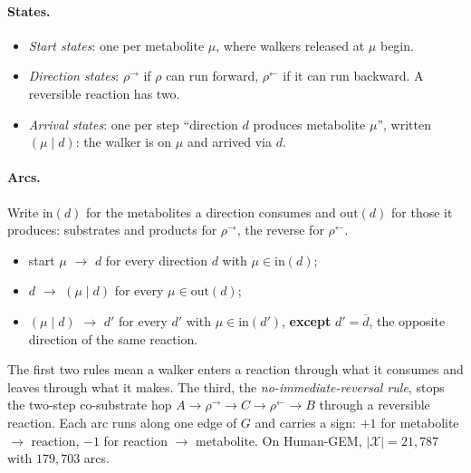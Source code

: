 \documentclass[11pt]{article}
\newcommand{\X}{\mathcal{X}}
\newcommand{\fwd}{{\rightarrow}}
\newcommand{\bwd}{{\leftarrow}}
\begin{document}
\paragraph{States.}
\begin{itemize}[nosep]
  \item \emph{Start states}: one per metabolite $\mu$, where walkers released at
        $\mu$ begin.
  \item \emph{Direction states}: $\rho^{\fwd}$ if $\rho$ can run forward, $\rho^{\bwd}$
        if it can run backward. A reversible reaction has two.
  \item \emph{Arrival states}: one per step ``direction $d$ produces metabolite
        $\mu$'', written $(\mu\mid d)$: the walker is on $\mu$ and arrived via $d$.
\end{itemize}

\paragraph{Arcs.}
Write $\mathrm{in}(d)$ for the metabolites a direction consumes and
$\mathrm{out}(d)$ for those it produces: substrates and products for $\rho^{\fwd}$,
the reverse for $\rho^{\bwd}$.
\begin{itemize}[nosep]
  \item start $\mu$ $\to$ $d$ for every direction $d$ with $\mu\in\mathrm{in}(d)$;
  \item $d$ $\to$ $(\mu\mid d)$ for every $\mu\in\mathrm{out}(d)$;
  \item $(\mu\mid d)$ $\to$ $d'$ for every $d'$ with $\mu\in\mathrm{in}(d')$,
        \textbf{except} $d'=\overline{d}$, the opposite direction of the same reaction.
\end{itemize}
The first two rules mean a walker enters a reaction through what it consumes and
leaves through what it makes. The third, the \emph{no-immediate-reversal rule}, stops
the two-step co-substrate hop $A\to\rho^{\fwd}\to C\to\rho^{\bwd}\to B$ through a
reversible reaction. Each arc runs along one edge of $G$ and carries a sign: $+1$ for
metabolite $\to$ reaction, $-1$ for reaction $\to$ metabolite. On Human-GEM,
$|\X|=21{,}787$ with $179{,}703$ arcs.
\end{document}
